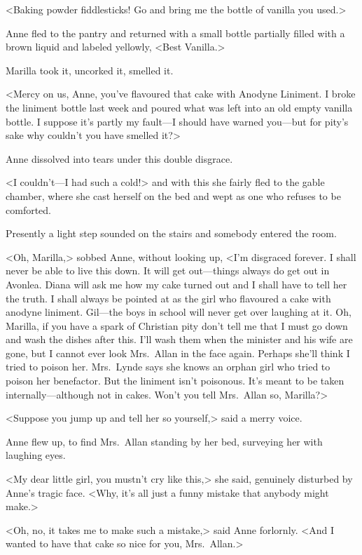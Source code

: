 <Baking powder fiddlesticks! Go and bring me the bottle of vanilla you used.>

Anne fled to the pantry and returned with a small bottle partially filled with a brown liquid and labeled yellowly, <Best Vanilla.>

Marilla took it, uncorked it, smelled it.

<Mercy on us, Anne, you've flavoured that cake with Anodyne Liniment. I broke the liniment bottle last week and poured what was left into an old empty vanilla bottle. I suppose it's partly my fault—I should have warned you—but for pity's sake why couldn't you have smelled it?>

Anne dissolved into tears under this double disgrace.

<I couldn't—I had such a cold!> and with this she fairly fled to the gable chamber, where she cast herself on the bed and wept as one who refuses to be comforted.

Presently a light step sounded on the stairs and somebody entered the room.

<Oh, Marilla,> sobbed Anne, without looking up, <I'm disgraced forever. I shall never be able to live this down. It will get out—things always do get out in Avonlea. Diana will ask me how my cake turned out and I shall have to tell her the truth. I shall always be pointed at as the girl who flavoured a cake with anodyne liniment. Gil—the boys in school will never get over laughing at it. Oh, Marilla, if you have a spark of Christian pity don't tell me that I must go down and wash the dishes after this. I'll wash them when the minister and his wife are gone, but I cannot ever look Mrs.~Allan in the face again. Perhaps she'll think I tried to poison her. Mrs.~Lynde says she knows an orphan girl who tried to poison her benefactor. But the liniment isn't poisonous. It's meant to be taken internally—although not in cakes. Won't you tell Mrs.~Allan so, Marilla?>

<Suppose you jump up and tell her so yourself,> said a merry voice.

Anne flew up, to find Mrs.~Allan standing by her bed, surveying her with laughing eyes.

<My dear little girl, you mustn't cry like this,> she said, genuinely disturbed by Anne's tragic face. <Why, it's all just a funny mistake that anybody might make.>

<Oh, no, it takes me to make such a mistake,> said Anne forlornly. <And I wanted to have that cake so nice for you, Mrs.~Allan.>

